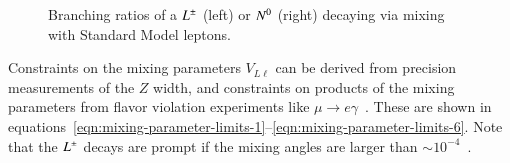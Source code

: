 \begin{figure}[h]
  \centering
  \hfill
  \caption{Branching ratios of a $L^{\pm}$ (left) or $N^{0}$ (right) decaying via mixing with Standard Model leptons.}
  \label{fig:resonance-branching-ratios}
\end{figure}

Constraints on the mixing parameters $V_{L\ell}$ can be derived from precision measurements of the $Z$ width, and constraints on products of the mixing parameters from flavor violation experiments like $\mu\rightarrow e\gamma$~\cite{Abada:2008hr,Abada:2007kn,delAguila:2008cv,Altmannshofer:2014ej}. These are shown in equations~\ref{eqn:mixing-parameter-limits-1}--\ref{eqn:mixing-parameter-limits-6}. Note that the $L^{\pm}$ decays are prompt if the mixing angles are larger than $\sim10^{-4}$~\cite{arkanihamednaturalness}. 

